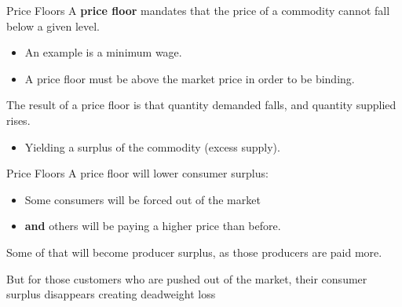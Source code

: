 \documentclass[11pt,t]{beamer}
\begin{document}
\begin{frame}{Price Floors}
  A \textbf{price floor} mandates that the price of a commodity cannot fall below a given level.
  
  \begin{itemize}
    \item An example is a minimum wage.
    
    \item A price floor must be above the market price in order to be binding.
  \end{itemize}

  \bigskip The result of a price floor is that quantity demanded falls, and quantity supplied rises.

  \begin{itemize}
    \item Yielding a surplus of the commodity (excess supply).
  \end{itemize}
\end{frame}


\begin{frame}{Price Floors}
  A price floor will lower consumer surplus:

  \begin{itemize}
    \item Some consumers will be forced out of the market
    \item \textbf{and} others will be paying a higher price than before.
  \end{itemize}
  
  \bigskip
  Some of that will become producer surplus, as those producers are paid more.

  \bigskip
  But for those customers who are pushed out of the market, their consumer surplus disappears creating deadweight loss
\end{frame}
\end{document}
